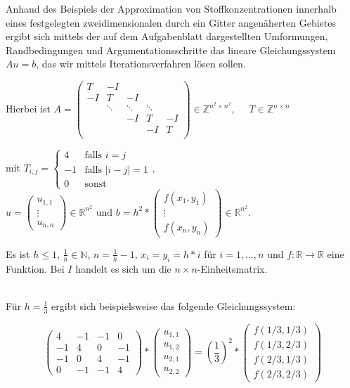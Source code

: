\documentclass{article}
\begin{document}
Anhand des Beispiels der Approximation von Stoffkonzentrationen innerhalb eines festgelegten zweidimensionalen durch ein Gitter angenäherten Gebietes ergibt sich mittels der auf dem Aufgabenblatt dargestellten Umformungen, Randbedingungen und Argumentationsschritte das lineare Gleichungssystem $Au = b$, das wir mittels Iterationsverfahren lösen sollen.

Hierbei ist
$A = \begin{pmatrix}
T & -I &  &  &  \\ 
-I & T & -I &  &  \\ 
 & \ddots & \ddots & \ddots &  \\ 
 &  & -I & T & -I \\ 
 &  &  & -I & T \\ 
\end{pmatrix} \in \mathbb{Z}^{n^2 \times n^2}, \quad$
$T \in \mathbb{Z}^{n \times n}$ 

mit $T_{i,j} = \begin{cases} 4 & \text{falls } i = j \\ -1 & \text{falls } |i-j| = 1 \\ 0 & \text{sonst}\end{cases}, \quad$ 
$u = \begin{pmatrix}
u_{1,1} \\ 
\vdots \\
u_{n,n}
\end{pmatrix} \in \mathbb{R}^{n^2} \text{ und } b = h^2 * \begin{pmatrix}
f(x_1, y_1) \\ 
\vdots \\
f(x_n, y_n)
\end{pmatrix} \in \mathbb{R}^{n^2}.$

Es ist $h \leq 1$, $\frac{1}{h} \in \mathbb{N}$, $n = \frac{1}{h}-1$, $x_i = y_i = h*i$ für $i = 1, \ldots, n$ und $f : \mathbb{R} \to \mathbb{R}$ eine Funktion. Bei $I$ handelt es sich um die $n \times n$-Einheitsmatrix.

~\\

Für $h = \frac{1}{3}$ ergibt sich beispielsweise das folgende Gleichungssystem:

$$\begin{pmatrix}
4 & -1 & -1 & 0 \\ 
-1 & 4 & 0 & -1 \\ 
-1 & 0 & 4 & -1 \\ 
0 & -1 & -1 & 4
\end{pmatrix} *
\begin{pmatrix}
u_{1,1} \\ 
u_{1,2} \\ 
u_{2,1} \\ 
u_{2,2}
\end{pmatrix} = \left(\frac{1}{3}\right)^2 *
\begin{pmatrix}
f(1/3,1/3) \\ 
f(1/3,2/3) \\ 
f(2/3,1/3) \\ 
f(2/3,2/3)
\end{pmatrix}
$$
\end{document}
